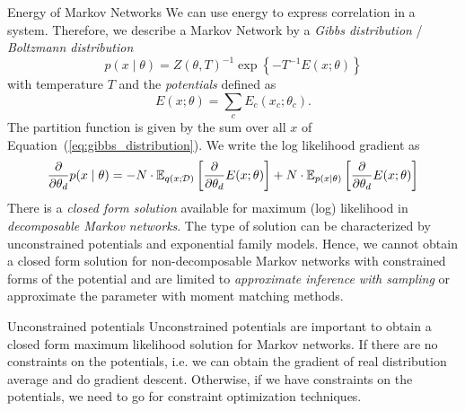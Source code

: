 \begin{topic}{.3cm}{Energy of Markov Networks}
	We can use energy to express correlation in a system. %
	Therefore, we describe a Markov Network by a \emph{Gibbs distribution} / \emph{Boltzmann distribution} %
	\begin{equation}
	p(x\mid\theta) = Z(\theta,T)^{-1} \exp\left\{ -T^{-1} E(x;\theta) \right\}
	\label{eq:gibbs_distribution}
	\end{equation}%
	with temperature \ensuremath{T} and the \emph{potentials} defined as %
	\begin{equation}
	E(x;\theta) = \sum_c E_c(x_c;\theta_c). %
	\end{equation}
	The partition function is given by the sum over all \ensuremath{x} of Equation~(\ref{eq:gibbs_distribution}). %
	We write the log likelihood gradient as %
	\begin{equation}
	\frac{\partial}{\partial\theta_d} p(x\mid\theta) = -N \cdot \E[q(x;\mathcal{D})]{\frac{\partial}{\partial\theta_d}E(x;\theta)} + N \cdot \E[p(x\mid\theta)]{\frac{\partial}{\partial\theta_d}E(x;\theta)}
	\end{equation}
	There is a \emph{closed form solution} available for maximum (log) likelihood in \emph{decomposable Markov networks}. %
	The type of solution can be characterized by unconstrained potentials and exponential family models. %
	Hence, we cannot obtain a closed form solution for non-decomposable Markov networks with constrained forms of the potential and are limited to \emph{approximate inference with sampling} or approximate the parameter with moment matching methods. %
\end{topic}
\begin{topic}{.3cm}{Unconstrained potentials}
	Unconstrained potentials are important to obtain a closed form maximum likelihood solution for Markov networks. %
	If there are no constraints on the potentials, i.e. we can obtain the gradient of real distribution average and do gradient descent. %
	Otherwise, if we have constraints on the potentials, we need to go for constraint optimization techniques. %
\end{topic}
\newpage
